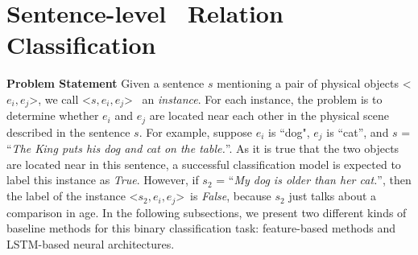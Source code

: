 %
\section{Sentence-level \lnear\ Relation Classification}
\label{sec:classify} 
\textbf{Problem Statement} 
Given a sentence $s$ mentioning a pair of physical objects 
\textless$e_i,e_j$\textgreater, we call \textless$s,e_i,e_j$\textgreater
~an {\em instance}. 
For each instance, the problem is to determine whether $e_i$ and $e_j$ are located near each other in the physical scene described in the sentence $s$.
For example, suppose $e_i$ is ``dog", $e_j$ is ``cat'', and $s$ = ``\textit{The King puts his dog and cat on the table.}''.
As it is true that the two objects are located near in this sentence, a successful classification model is expected to label this instance as \textit{True}.
However, if $s_2$ = ``\textit{My dog is older than her cat.}'', then the label of the instance \textless$s_2,e_i,e_j$\textgreater ~is \textit{False}, because $s_2$ just talks about a comparison in age.
In the following subsections, we present two different kinds of baseline methods for this binary classification task: feature-based methods and  LSTM-based neural architectures.

